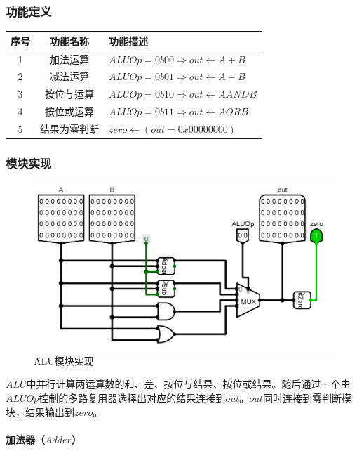 \documentclass[main.tex]{subfiles}
\begin{document}
\subsubsection{功能定义}
\begin{center}
    \begin{tabular}{c c l}
        \toprule
        序号 & 功能名称 & 功能描述 \\
        \midrule
        1 & 加法运算 & $ALUOp = 0b00 \Rightarrow out \leftarrow A+B$ \\
        2 & 减法运算 & $ALUOp = 0b01 \Rightarrow out \leftarrow A-B$ \\
        3 & 按位与运算 & $ALUOp = 0b10 \Rightarrow out \leftarrow A AND B$ \\
        4 & 按位或运算 & $ALUOp = 0b11 \Rightarrow out \leftarrow A OR B$ \\
        5 & 结果为零判断 & $zero \leftarrow \left( out = 0x00000000 \right) $ \\
        \bottomrule
    \end{tabular}
\end{center}

\subsubsection{模块实现}
\begin{figure}[h]
\centering
\includegraphics[width=\textwidth]{images/ALU-circuit.png}
\caption{ALU模块实现}
\end{figure}
$ALU$中并行计算两运算数的和、差、按位与结果、按位或结果。随后通过一个由$ALUOp$控制的多路复用器选择出对应的结果连接到$out$。$out$同时连接到零判断模块，结果输出到$zero$。

\paragraph{加法器（$Adder$）}
\end{document}
